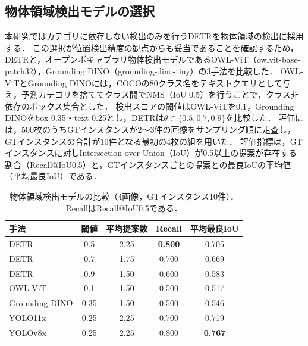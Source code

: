 \subsection{物体領域検出モデルの選択}
本研究ではカテゴリに依存しない検出のみを行うDETRを物体領域の検出に採用する．
この選択が位置検出精度の観点からも妥当であることを確認するため，DETRと，オープンボキャブラリ物体検出モデルであるOWL-ViT（owlvit-base-patch32）\cite{ref_OWLViT}，Grounding DINO（grounding-dino-tiny）\cite{ref_GDINO}の3手法を比較した．
OWL-ViTとGrounding DINOには，COCOの80クラス名をテキストクエリとして与え，予測カテゴリを捨ててクラス間でNMS（IoU 0.5）を行うことで，クラス非依存のボックス集合とした．
検出スコアの閾値はOWL-ViTを0.1，Grounding DINOをbox 0.35・text 0.25とし，DETRは$ \theta \in \{0.5, 0.7, 0.9\} $を比較した．
評価には，500枚のうちGTインスタンスが2〜3件の画像をサンプリング順に走査し，GTインスタンスの合計が10件となる最初の4枚の組を用いた．
評価指標は，GTインスタンスに対しIntersection over Union（IoU）が0.5以上の提案が存在する割合（Recall@IoU0.5）と，GTインスタンスごとの提案との最良IoUの平均値（平均最良IoU）である．

\begin{table}[t]
    \centering
    \caption{物体領域検出モデルの比較（4画像，GTインスタンス10件）．RecallはRecall@IoU0.5である．}
    \label{tab_detectors}
    \footnotesize
    \setlength{\tabcolsep}{3pt}
    \begin{tabular}{lcccc}
        \toprule
        手法 & 閾値 & 平均提案数 & Recall & 平均最良IoU \\
        \midrule
        DETR           & 0.5  & 2.25 & {\bf 0.800} & 0.705 \\
        DETR           & 0.7  & 1.75 & 0.700 & 0.669 \\
        DETR           & 0.9  & 1.50 & 0.600 & 0.583 \\
        OWL-ViT        & 0.1  & 1.50 & 0.500 & 0.517 \\
        Grounding DINO & 0.35 & 1.50 & 0.500 & 0.546 \\
        YOLO11x & 0.25 & 2.25 & 0.700 & 0.719 \\
        YOLOv8x & 0.25 & 2.25 & 0.800 & {\bf 0.767} \\
        \bottomrule
    \end{tabular}
\end{table}

